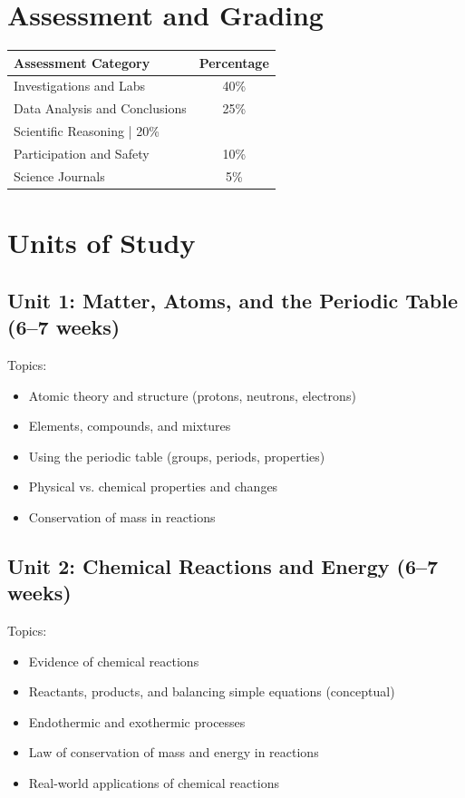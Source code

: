 \documentclass[11pt,letterpaper]{report}
\begin{document}
\section{Assessment and Grading}

\begin{center}
\begin{tabular}{|l|c|}
\hline
\textbf{Assessment Category} & \textbf{Percentage} \\
\hline
Investigations and Labs & 40\% \\
\hline
Data Analysis and Conclusions & 25\% \\
\hline
Scientific Reasoning | 20\% \\
\hline
Participation and Safety & 10\% \\
\hline
Science Journals & 5\% \\
\hline
\end{tabular}
\end{center}

\section{Units of Study}

\subsection{Unit 1: Matter, Atoms, and the Periodic Table (6–7 weeks)}

Topics:
\begin{itemize}
\item Atomic theory and structure (protons, neutrons, electrons)
\item Elements, compounds, and mixtures
\item Using the periodic table (groups, periods, properties)
\item Physical vs. chemical properties and changes
\item Conservation of mass in reactions
\end{itemize}

\subsection{Unit 2: Chemical Reactions and Energy (6–7 weeks)}

Topics:
\begin{itemize}
\item Evidence of chemical reactions
\item Reactants, products, and balancing simple equations (conceptual)
\item Endothermic and exothermic processes
\item Law of conservation of mass and energy in reactions
\item Real-world applications of chemical reactions
\end{itemize}
\end{document}
